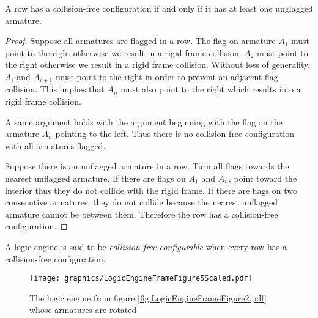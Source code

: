 \begin{lem}\label{lem:logicEngine1}A row has a collision-free configuration if and only if it has 
at least one unglagged armature. \end{lem}
\begin{proof}

Suppose all armatures are flagged in a row.  The flag on armature $A_1$ must point to the 
right otherwise we result in a rigid frame collision.  $A_2$ must point to the right otherwise 
we result in a rigid frame collision.  Without loss of generality, $A_i$ and $A_{i+1}$ must 
point to the right in order to prevent an adjacent flag collision.  This implies that $A_n$ 
must also point to the right which results into a rigid frame collision.

A same argument holds with the argument beginning with the flag 
on the armature $A_n$ pointing to the left.  Thus there is no collision-free configuration with 
all armatures flagged.


Suppose there is an unflagged armature in a row.  Turn all flags towards the nearest unflagged 
armature.  If there are flags on $A_1$ and $A_n$, point toward the interior thus they do not 
collide with the rigid frame.  If there are flags on two consecutive armatures, they do not collide 
because the nearest unflagged armature cannot be between them.  Therefore the row has a 
collision-free configuration.
\end{proof}

A logic engine is said to be \textit{collision-free configurable} when every row has a collision-free configuration.
\begin{figure}[!ht]
\begin{center}
\texttt{[image: graphics/LogicEngineFrameFigure5Scaled.pdf]}
\caption{The logic engine from figure \ref{fig:LogicEngineFrameFigure2.pdf} whose armatures are rotated}\label{fig:LogicEngineFrameFigure5.pdf}
\end{center}
\end{figure}

